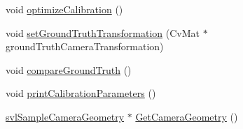 \begin{DoxyCompactItemize}
\item 
void \hyperlink{classsvl_c_c_calibration_grid_ac92fde3ddfa68b36159a6a69d64f2d0f}{optimize\+Calibration} ()
\item 
void \hyperlink{classsvl_c_c_calibration_grid_a2b38609fe50a0de989d81fdfbac12839}{set\+Ground\+Truth\+Transformation} (Cv\+Mat $\ast$ground\+Truth\+Camera\+Transformation)
\item 
void \hyperlink{classsvl_c_c_calibration_grid_a24446cf287b96d1b8dabe3a5561f9db3}{compare\+Ground\+Truth} ()
\item 
void \hyperlink{classsvl_c_c_calibration_grid_a92d222b6bcb5b747b343d8c35e2994ce}{print\+Calibration\+Parameters} ()
\item 
\hyperlink{classsvl_sample_camera_geometry}{svl\+Sample\+Camera\+Geometry} $\ast$ \hyperlink{classsvl_c_c_calibration_grid_af638b388dc77d852572e574bcf43a09c}{Get\+Camera\+Geometry} ()
\end{DoxyCompactItemize}
